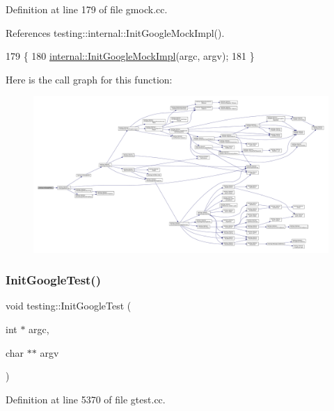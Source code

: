 Definition at line 179 of file gmock.\+cc.



References testing\+::internal\+::\+Init\+Google\+Mock\+Impl().


\begin{DoxyCode}
179                                                           \{
180   \hyperlink{namespacetesting_1_1internal_a3823844199df88af9493026031cf7744}{internal::InitGoogleMockImpl}(argc, argv);
181 \}
\end{DoxyCode}
Here is the call graph for this function\+:
\nopagebreak
\begin{figure}[H]
\begin{center}
\leavevmode
\includegraphics[width=350pt]{namespacetesting_a20fb86152763dddef67bc1dd8b090800_cgraph}
\end{center}
\end{figure}
\mbox{\label{namespacetesting_afd726ae08c9bd16dc52f78c822d9946b}} 
\subsubsection{\texorpdfstring{Init\+Google\+Test()}{InitGoogleTest()}\hspace{0.1cm}{\footnotesize\ttfamily [1/2]}}
{\footnotesize\ttfamily void testing\+::\+Init\+Google\+Test (\begin{DoxyParamCaption}\item[{int $\ast$}]{argc,  }\item[{char $\ast$$\ast$}]{argv }\end{DoxyParamCaption})}



Definition at line 5370 of file gtest.\+cc.



